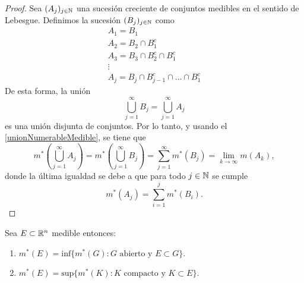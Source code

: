 \begin{proof}
    Sea \((A_j)_{j \in \mathbb{N}}\) una sucesión creciente de conjuntos medibles en el sentido de Lebesgue. Definimos la sucesión \((B_j)_{j \in \mathbb{N}}\) como
    \[\begin{matrix}
        A_1 = B_1                       \\
        A_2 = B_2 \cap B_1^c            \\
        A_3 = B_3 \cap B_2^c \cap B_1^c \\
        \vdots                          \\
        A_j = B_j \cap B_{j-1}^c \cap \ldots \cap B_1^c
    \end{matrix}\]
    De esta forma, la unión
    \[
    \bigcup_{j=1}^\infty B_j = \bigcup_{j=1}^\infty A_j
    \]
    es una unión disjunta de conjuntos. Por lo tanto, y usando el \cref{unionNumerableMedible}, se tiene que
    \[
    m^*\left(\bigcup_{j=1}^\infty A_j\right) = m^*\left(\bigcup_{j=1}^\infty B_j\right) = \sum_{j=1}^\infty m^*(B_j) = \lim_{k \to \infty} m(A_k),
    \]
    donde la última igualdad se debe a que para todo \( j \in \mathbb{N} \) se cumple
    \[
    m^*(A_j) = \sum_{i=1}^j m^*(B_i).
    \]
\end{proof}


\begin{corolario}
    Sea $E \subset \mathbb{R}^n$ medible entonces:
    \vspace{-0.5em}
    \begin{enumerate}
        \item $m^*(E) = \text{inf}\{m^*(G) : G \text{ abierto y } E \subset G\}$.
        \item $m^*(E) = \text{sup}\{m^*(K) : K \text{ compacto y } K \subset E\}$.
    \end{enumerate}
\end{corolario}


